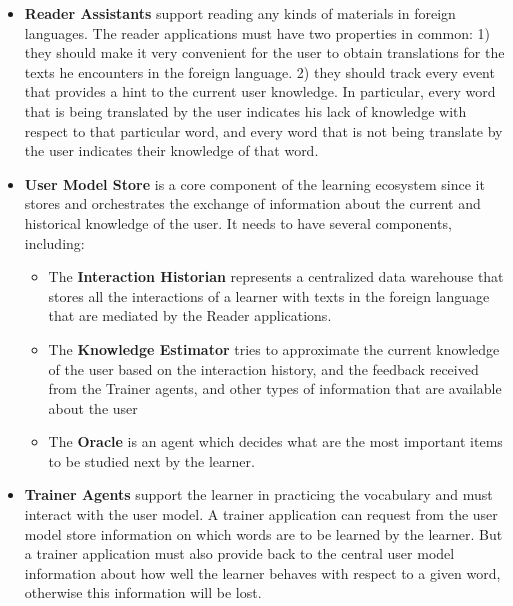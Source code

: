 \begin{itemize}
	
	\item {\bf Reader Assistants} 
	support reading any kinds of materials in foreign languages. The reader applications must have two properties in common: 
		1) they should make it very convenient for the user to obtain translations for the texts he encounters in the foreign language. 
		2) they should track every event that provides a hint to the current user knowledge. In particular, every word that is being translated by the user indicates his lack of knowledge with respect to that particular word, and every word that is not being translate by the user indicates their knowledge of that word. 
	
		\item {\bf User Model Store} 
		is a core component of the learning ecosystem since it stores and orchestrates the exchange of information about the current and historical knowledge of the user. It needs to have several components, including: 

		\begin{itemize}

			\item The {\bf Interaction Historian} represents a centralized data warehouse that stores all the interactions of a learner with texts in the foreign language that are mediated by the Reader applications.

			\item The {\bf Knowledge Estimator} tries to approximate the current knowledge of the user based on the interaction history, and the feedback received from the Trainer agents, and other types of information that are available about the user

			\item The {\bf Oracle} is an agent which decides what are the most important items to be studied next by the learner. 

		\end{itemize}


	\item {\bf Trainer Agents} support the learner in practicing the vocabulary and must interact with the user model. A trainer application can request from the user model store information on which words are to be learned by the learner. But a trainer application must also provide back to the central user model information about how well the learner behaves with respect to a given word, otherwise this information will be lost. 
	

\end{itemize}
